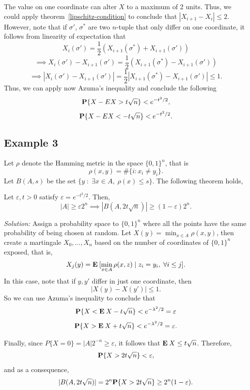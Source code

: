 The value on one coordinate can alter $X$ to a maximum of 2 units. Thus, we could apply {theorem}~\ref{lipschitz-condition} to conclude that $|X_{i+1}- X_i| \leq 2$. However, note that if $\sigma'$, $\sigma^*$ are two $n$-tuple that only differ on one coordinate, it follows from linearity of expectation that
\[ X_i(\sigma') = \frac{1}{2}(X_{i+1}(\sigma^*)+ X_{i+1}(\sigma')) \]
\[ \implies X_i(\sigma') - X_{i+1}(\sigma')  = \frac{1}{2}(X_{i+1}(\sigma^*)- X_{i+1}(\sigma'))\] 
\[ \implies  |X_i(\sigma') - X_{i+1}(\sigma')|  = \frac{1}{2}|X_{i+1}(\sigma^*)- X_{i+1}(\sigma')| \leq 1.\]
Thus, we can apply now Azuma's inequality and conclude the following
\[ \P\{X - E X > t \sqrt{n}\} < e^{-t^2/2}, \] 
\[ \P\{X - E X < -t \sqrt{n}\} < e^{-t^2/2}. \]
\subsection*{Example 3}
Let $\rho$ denote the Hamming metric in the space ${\{0,1\}}^n$, that is
\[ \rho(x,y) = \#\{i : x_i \neq y_i\}. \]
Let $B(A,s)$ be the set $\{y \;:\; \exists x\in A,\;\rho(x)\leq s\}$. The following theorem holds,

\begin{theorem} Let $\varepsilon, t > 0$ satisfy $\varepsilon = e^{-t^2 / 2}$. Then,
    \[ |A| \geq \varepsilon 2^n \implies |B(A,2t\sqrt{n})| \geq (1-\varepsilon) 2^n. \] 
\end{theorem}

\vspace*{1em}

\textit{Solution:} Assign a probability space to ${\{0,1\}}^n$ where all the points have the same probability of being chosen at random. Let $X(y) = \min_{x\in A} \rho(x,y)$, then create a martingale $X_0, \ldots, X_n$ based on the number of coordinates of $\{0,1\}^n$ exposed, that is,
\[ X_j(y) = \E [\min_{x\in A} \rho(x,z) \; | \; z_i = y_i,\; \forall i\leq j]. \]
In this case, note that if $y, y'$ differ in just one coordinate, then
\[ |X(y) - X(y')| \leq 1. \]
So we can use Azuma's inequality to conclude that
\[ \P\{X < \E X - t\sqrt{n}\} < e^{-\lambda^2/2} = \varepsilon \]   
\[ \P\{X > \E X + t\sqrt{n}\} < e^{-\lambda^2/2} = \varepsilon. \]   

Finally, since $P\{X = 0\} = |A|2^{-n} \geq \varepsilon$, it follows that $\E X \leq t\sqrt{n}$. Therefore,
\[ \P\{X > 2t\sqrt{n}\} < \varepsilon, \]
and as a consequence,
\[ |B(A,2t\sqrt{n})| = 2^n\P\{X > 2t\sqrt{n}\} \geq 2^n (1-\varepsilon) .  \] 

\vspace*{3em}
